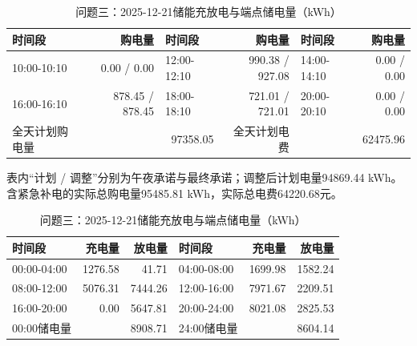 \begin{table}[H]\centering\small\setlength{\tabcolsep}{5pt}
\caption{问题三：2025-12-21购电结果（电量：kWh；费用：元）}
\begin{tabular}{lrlrlr}\toprule
时间段 & 购电量 & 时间段 & 购电量 & 时间段 & 购电量 \\\midrule
10:00-10:10 & 0.00 / 0.00 & 12:00-12:10 & 990.38 / 927.08 & 14:00-14:10 & 0.00 / 0.00\\
16:00-16:10 & 878.45 / 878.45 & 18:00-18:10 & 721.01 / 721.01 & 20:00-20:10 & 0.00 / 0.00\\
\midrule 全天计划购电量 & \multicolumn{2}{r}{97358.05} & 全天计划电费 & \multicolumn{2}{r}{62475.96}\\\bottomrule
\end{tabular}
\par\vspace{2pt}\footnotesize
表内“计划 / 调整”分别为午夜承诺与最终承诺；调整后计划电量94869.44 kWh。
含紧急补电的实际总购电量95485.81 kWh，实际总电费64220.68元。
\vspace{3pt}\small
\caption{问题三：2025-12-21储能充放电与端点储电量（kWh）}
\begin{tabular}{lrrlrr}\toprule
时间段 & 充电量 & 放电量 & 时间段 & 充电量 & 放电量 \\\midrule
00:00-04:00 & 1276.58 & 41.71 & 04:00-08:00 & 1699.98 & 1582.24\\
08:00-12:00 & 5076.31 & 7444.26 & 12:00-16:00 & 7971.67 & 2209.51\\
16:00-20:00 & 0.00 & 5647.81 & 20:00-24:00 & 8021.08 & 2825.53\\
\midrule 00:00储电量 & \multicolumn{2}{r}{8908.71} & 24:00储电量 & \multicolumn{2}{r}{8604.14}\\\bottomrule
\end{tabular}\end{table}
